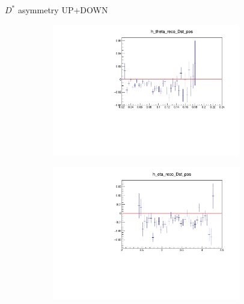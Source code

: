 \documentclass[11pt]{beamer}
\begin{document}
\begin{frame}{$D^*$ asymmetry UP+DOWN}
\begin{figure}
\begin{subfigure}{0.45\textwidth}
\end{subfigure}
\begin{subfigure}{0.45\textwidth}
\includegraphics[width=0.9\textwidth]{up_plus_down_pdf/theta_4.pdf}
\end{subfigure}
\begin{subfigure}{0.45\textwidth}
\includegraphics[width=0.9\textwidth]{up_plus_down_pdf/eta_4.pdf}
\end{subfigure}
\end{figure}
\end{frame}
\end{document}
